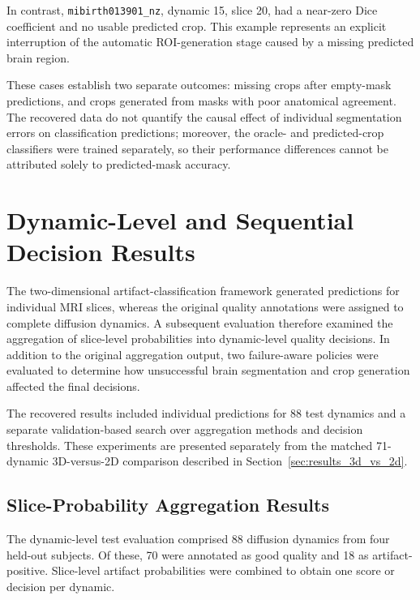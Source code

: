 In contrast, \texttt{mibirth013901\_nz}, dynamic 15, slice 20, had a near-zero Dice coefficient and no usable predicted crop. This example represents an explicit interruption of the automatic ROI-generation stage caused by a missing predicted brain region.


These cases establish two separate outcomes: missing crops after empty-mask predictions, and crops generated from masks with poor anatomical agreement. The recovered data do not quantify the causal effect of individual segmentation errors on classification predictions; moreover, the oracle- and predicted-crop classifiers were trained separately, so their performance differences cannot be attributed solely to predicted-mask accuracy.

\section{Dynamic-Level and Sequential Decision Results}
\label{sec:results_dynamic_decisions}

The two-dimensional artifact-classification framework generated predictions for individual MRI slices, whereas the original quality annotations were assigned to complete diffusion dynamics. A subsequent evaluation therefore examined the aggregation of slice-level probabilities into dynamic-level quality decisions. In addition to the original aggregation output, two failure-aware policies were evaluated to determine how unsuccessful brain segmentation and crop generation affected the final decisions.

The recovered results included individual predictions for 88 test dynamics and a separate validation-based search over aggregation methods and decision thresholds. These experiments are presented separately from the matched 71-dynamic 3D-versus-2D comparison described in Section~\ref{sec:results_3d_vs_2d}.

\subsection{Slice-Probability Aggregation Results}
\label{subsec:results_dynamic_aggregation}

The dynamic-level test evaluation comprised 88 diffusion dynamics from four held-out subjects. Of these, 70 were annotated as good quality and 18 as artifact-positive. Slice-level artifact probabilities were combined to obtain one score or decision per dynamic.

